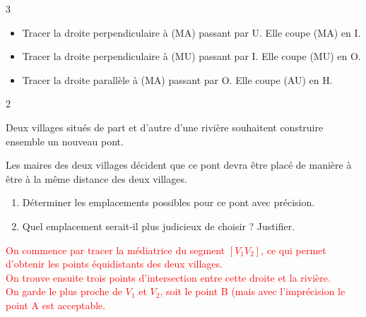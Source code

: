 \documentclass[a4paper]{book}
\begin{document}
{\begin{exerciceNote}{3}
        \begin{itemize}
            \item Tracer la droite perpendiculaire à (MA) passant par U. Elle coupe (MA) en I.
            \item Tracer la droite perpendiculaire à (MU) passant par I. Elle coupe (MU) en O.
            \item Tracer la droite parallèle à (MA) passant par O. Elle coupe (AU) en H.        
        \end{itemize}

        \begin{center}
        \end{center}
        
    \end{exerciceNote}


\newpage


    \begin{exerciceNote}{2}
        \begin{minipage}{0.5\linewidth}
            Deux villages situés de part et d’autre d’une rivière souhaitent construire ensemble un nouveau pont. 

            Les maires des deux villages décident que ce pont devra être placé de manière à être à la même distance des deux villages. 
            
            \begin{enumerate}[leftmargin=*]
                \item Déterminer les emplacements possibles pour ce pont avec précision.

                \item Quel emplacement serait-il plus judicieux de choisir ? Justifier.
            \end{enumerate}
        \end{minipage}
        \hfill
        \begin{minipage}{0.49\linewidth}
            \begin{center}
            \end{center}
        \end{minipage}

        \medskip

        \textcolor{red}{On commence par tracer la médiatrice du segment $[V_1V_2]$, ce qui permet d'obtenir les points équidistants des deux villages.\\
        On trouve ensuite trois points d'intersection entre cette droite et la rivière.\\
        On garde le plus proche de $V_1$ et $V_2$, soit le point B (mais avec l'imprécision le point A est acceptable.}
    \end{exerciceNote}
    
}
\end{document}
